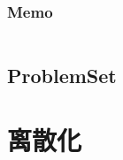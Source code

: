 \documentclass[a4paper,12pt]{article}
\begin{document}
\subsubsection{Memo}
\inputminted[]{c++}{Template/String/usage/sam-1.cpp}
\subsection{ProblemSet}
\section{离散化}




\end{document}
